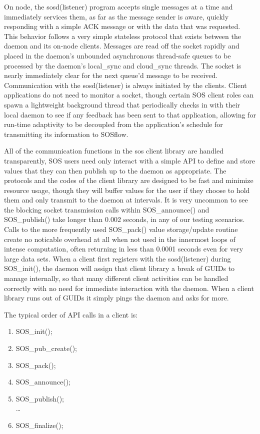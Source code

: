 On node, the sosd(listener) program accepts single messages at a time
and immediately services them, as far as the message sender is aware,
quickly responding with a simple ACK message or with the data that was
requested.  This behavior follows a very simple stateless protocol
that exists between the daemon and its on-node clients. Messages are
read off the socket rapidly and placed in the daemon's unbounded
asynchronous thread-safe queues to be processed by the daemon's
local\_sync and cloud\_sync threads. The socket is nearly immediately
clear for the next queue'd message to be received. Communication with
the sosd(listener) is always initiated by the clients.  Client
applications do not need to monitor a socket, though certain SOS
client roles can spawn a lightweight background thread that
periodically checks in with their local daemon to see if any feedback
has been sent to that application, allowing for run-time adaptivity to
be decoupled from the application's schedule for transmitting its
information to SOSflow.

All of the communication functions in the sos client library are
handled transparently, SOS users need only interact with a simple API
to define and store values that they can then publish up to the daemon
as appropriate.  The protocols and the codes of the client library are
designed to be fast and minimize resource usage, though they will
buffer values for the user if they choose to hold them and only
transmit to the daemon at intervals.  It is very uncommon to see the
blocking socket transmission calls within SOS\_announce() and
SOS\_publish() take longer than 0.002 seconds, in any of our testing
scenarios. Calls to the more frequently used SOS\_pack() value storage/update
routine create no noticable overhead at all when not used in the
innermost loops of intense computation, often returning in less than
0.0001 seconds even for very large data sets. When a client first
registers with the sosd(listener) during SOS\_init(), the daemon will
assign that client library a break of GUIDs to manage internally, so
that many different client activities can be handled correctly with no
need for immediate interaction with the daemon. When a client library
runs out of GUIDs it simply pings the daemon and asks for more.

The typical order of API calls in a client is:
\begin{enumerate}
    \item SOS\_init();
    \item SOS\_pub\_create();
    \item SOS\_pack();
    \item SOS\_announce();
    \item SOS\_publish();\\
    \dots
    \item SOS\_finalize();
\end{enumerate}

